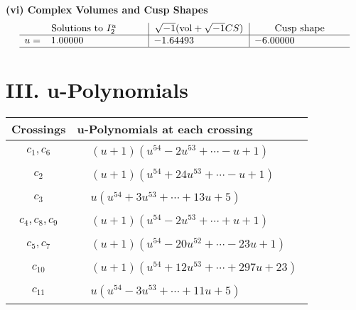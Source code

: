 \documentclass[1p]{elsarticle_modified}
\theoremstyle{definition}
\newcommand{\I}{\sqrt{-1}}
\begin{document}
\newpage\flushleft \textbf{(vi) Complex Volumes and Cusp Shapes}
$$\begin{array}{c|c|c}  
\text{Solutions to }I^u_{2}& \I (\text{vol} + \sqrt{-1}CS) & \text{Cusp shape}\\
 \hline 
\begin{aligned}
u &= \phantom{-}1.00000\phantom{ +0.000000I}\end{aligned}
 & -1.64493\phantom{ +0.000000I} & -6.00000\phantom{ +0.000000I}\\
 \hline 
 \end{array}$$\newpage
\newpage\renewcommand{\arraystretch}{1}
\centering \section*{ III. u-Polynomials}
\begin{tabular}{m{50pt}|m{274pt}}
Crossings & \hspace{64pt}u-Polynomials at each crossing \\
\hline $$\begin{aligned}c_{1},c_{6}\end{aligned}$$&$\begin{aligned}
&(u+1)(u^{54}-2 u^{53}+\cdots- u+1)
\end{aligned}$\\
\hline $$\begin{aligned}c_{2}\end{aligned}$$&$\begin{aligned}
&(u+1)(u^{54}+24 u^{53}+\cdots- u+1)
\end{aligned}$\\
\hline $$\begin{aligned}c_{3}\end{aligned}$$&$\begin{aligned}
&u(u^{54}+3 u^{53}+\cdots+13 u+5)
\end{aligned}$\\
\hline $$\begin{aligned}c_{4},c_{8},c_{9}\end{aligned}$$&$\begin{aligned}
&(u+1)(u^{54}-2 u^{53}+\cdots+u+1)
\end{aligned}$\\
\hline $$\begin{aligned}c_{5},c_{7}\end{aligned}$$&$\begin{aligned}
&(u+1)(u^{54}-20 u^{52}+\cdots-23 u+1)
\end{aligned}$\\
\hline $$\begin{aligned}c_{10}\end{aligned}$$&$\begin{aligned}
&(u+1)(u^{54}+12 u^{53}+\cdots+297 u+23)
\end{aligned}$\\
\hline $$\begin{aligned}c_{11}\end{aligned}$$&$\begin{aligned}
&u(u^{54}-3 u^{53}+\cdots+11 u+5)
\end{aligned}$\\
\hline
\end{tabular}\newpage\renewcommand{\arraystretch}{1}
\end{document}
